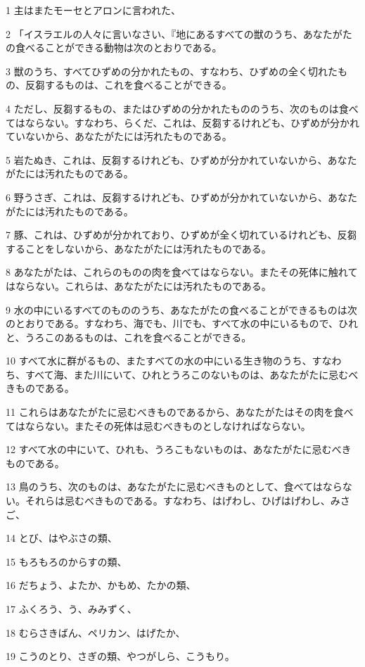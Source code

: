 \par 1 主はまたモーセとアロンに言われた、
\par 2 「イスラエルの人々に言いなさい、『地にあるすべての獣のうち、あなたがたの食べることができる動物は次のとおりである。
\par 3 獣のうち、すべてひずめの分かれたもの、すなわち、ひずめの全く切れたもの、反芻するものは、これを食べることができる。
\par 4 ただし、反芻するもの、またはひずめの分かれたもののうち、次のものは食べてはならない。すなわち、らくだ、これは、反芻するけれども、ひずめが分かれていないから、あなたがたには汚れたものである。
\par 5 岩たぬき、これは、反芻するけれども、ひずめが分かれていないから、あなたがたには汚れたものである。
\par 6 野うさぎ、これは、反芻するけれども、ひずめが分かれていないから、あなたがたには汚れたものである。
\par 7 豚、これは、ひずめが分かれており、ひずめが全く切れているけれども、反芻することをしないから、あなたがたには汚れたものである。
\par 8 あなたがたは、これらのものの肉を食べてはならない。またその死体に触れてはならない。これらは、あなたがたには汚れたものである。
\par 9 水の中にいるすべてのもののうち、あなたがたの食べることができるものは次のとおりである。すなわち、海でも、川でも、すべて水の中にいるもので、ひれと、うろこのあるものは、これを食べることができる。
\par 10 すべて水に群がるもの、またすべての水の中にいる生き物のうち、すなわち、すべて海、また川にいて、ひれとうろこのないものは、あなたがたに忌むべきものである。
\par 11 これらはあなたがたに忌むべきものであるから、あなたがたはその肉を食べてはならない。またその死体は忌むべきものとしなければならない。
\par 12 すべて水の中にいて、ひれも、うろこもないものは、あなたがたに忌むべきものである。
\par 13 鳥のうち、次のものは、あなたがたに忌むべきものとして、食べてはならない。それらは忌むべきものである。すなわち、はげわし、ひげはげわし、みさご、
\par 14 とび、はやぶさの類、
\par 15 もろもろのからすの類、
\par 16 だちょう、よたか、かもめ、たかの類、
\par 17 ふくろう、う、みみずく、
\par 18 むらさきばん、ペリカン、はげたか、
\par 19 こうのとり、さぎの類、やつがしら、こうもり。
